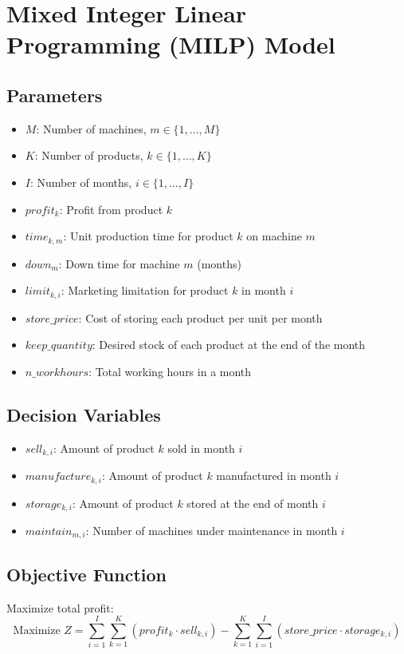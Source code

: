 \documentclass{article}
\begin{document}
\section*{Mixed Integer Linear Programming (MILP) Model}

\subsection*{Parameters}
\begin{itemize}
    \item $M$: Number of machines, $m \in \{1, \ldots, M\}$
    \item $K$: Number of products, $k \in \{1, \ldots, K\}$
    \item $I$: Number of months, $i \in \{1, \ldots, I\}$
    \item $profit_k$: Profit from product $k$
    \item $time_{k,m}$: Unit production time for product $k$ on machine $m$
    \item $down_m$: Down time for machine $m$ (months)
    \item $limit_{k,i}$: Marketing limitation for product $k$ in month $i$
    \item $store\_price$: Cost of storing each product per unit per month
    \item $keep\_quantity$: Desired stock of each product at the end of the month
    \item $n\_workhours$: Total working hours in a month
\end{itemize}

\subsection*{Decision Variables}
\begin{itemize}
    \item $sell_{k,i}$: Amount of product $k$ sold in month $i$
    \item $manufacture_{k,i}$: Amount of product $k$ manufactured in month $i$
    \item $storage_{k,i}$: Amount of product $k$ stored at the end of month $i$
    \item $maintain_{m,i}$: Number of machines under maintenance in month $i$
\end{itemize}

\subsection*{Objective Function}
Maximize total profit:
\[
\text{Maximize } Z = \sum_{i=1}^{I} \sum_{k=1}^{K} (profit_k \cdot sell_{k,i}) - \sum_{k=1}^{K} \sum_{i=1}^{I} (store\_price \cdot storage_{k,i})
\]
\end{document}
